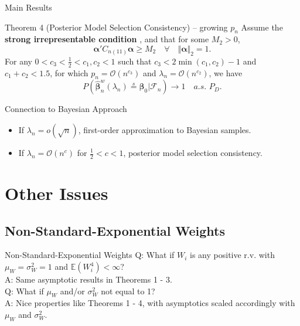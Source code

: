 \documentclass{beamer}
\newcommand{\bnw}{\widehat{\bm{\beta}}_n^w} %
\begin{document}
\begin{frame}{Main Results}
	\begin{block}{Theorem 4 (Posterior Model Selection Consistency) -- growing $p_n$}
		Assume the \textbf{strong irrepresentable condition} \citep{BinYu}, and that for some $M_2 >0$, 
		$$
		\bm{\alpha}' 
		C_{n(11)}
		\bm{\alpha}
		\geq M_2
		\quad
		\forall
		\quad
		\Vert \bm{\alpha} \Vert_2 = 1.
		$$
		For any $0 < c_3 < \frac{1}{2} < c_1 , c_2 < 1$ such that $c_3 < 2 \min(c_1, c_2) -  1$ and $c_1 + c_2 < 1.5$, for which $p_n = \mathcal{O} \left( n^{c_3} \right)$ and $\lambda_n = \mathcal{O} \left( n^{c_2} \right)$, we have
		$$
		P\left(
		\bnw (\lambda_n) \stackrel{s}{=} \bm{\beta}_0
		\big| \mathcal{F}_n 
		\right)	
		\to 1
		\quad a.s. \,\, P_D. 
		$$  	
	\end{block}
\end{frame}

\begin{frame}{Connection to Bayesian Approach}
\begin{itemize}
	\item If $\lambda_n = o (\sqrt{n})$, first-order approximation to Bayesian samples.
	\item If $\lambda_n = \mathcal{O} (n^c)$ for $\frac{1}{2} < c < 1$, posterior model selection consistency.
\end{itemize}
\end{frame}

\section{Other Issues}

\subsection{Non-Standard-Exponential Weights}

\begin{frame}{Non-Standard-Exponential Weights}
Q: What if $W_i$ is any positive r.v. with $\mu_W = \sigma^2_W = 1$ and $\mathbb{E} (W_i^4) < \infty$? \\
A: Same asymptotic results in Theorems 1 - 3. \\
\vspace{1.2cm}
Q: What if $\mu_W$  and/or $\sigma^2_W$ not equal to 1? \\
A: Nice properties like Theorems 1 - 4, with asymptotics scaled accordingly with $\mu_W$  and $\sigma^2_W$. 
\end{frame}
\end{document}
